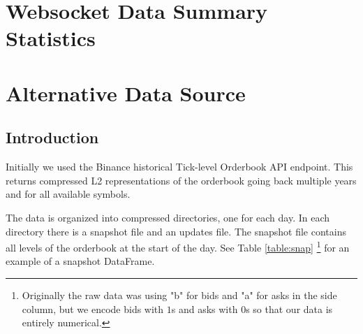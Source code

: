 \documentclass[a4paper, oneside, notitlepage]{book}
\begin{document}
\clearpage

\appendix

\chapter{Websocket Data Summary Statistics}

\chapter{Alternative Data Source}

\section{Introduction}

Initially we used the Binance historical Tick-level Orderbook API endpoint.
This returns compressed L2 representations of the orderbook going back multiple years and
for all available symbols.

The data is organized into compressed directories, one for each day. In each directory
there is a snapshot file and an updates file. The snapshot file contains all levels
of the orderbook at the start of the day. See Table \ref{table:snap} \footnote{Originally the raw data was using "b" for bids and "a" for asks in the side column, but we encode bids with $1$s and asks with $0$s so that our data is entirely numerical.}
for an example of a snapshot DataFrame.

\begin{table}[ht!]
    \centering
    \caption{Example snapshot data for BTCUSDT.}
    \label{table:snap}
\end{table}
\end{document}

